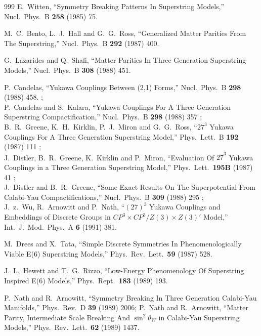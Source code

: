 \begin{thebibliography}{999}
  E.~Witten,
  ``Symmetry Breaking Patterns In Superstring Models,''
  Nucl.\ Phys.\ B {\bf 258} (1985) 75.

  M.~C.~Bento, L.~J.~Hall and G.~G.~Ross,
  ``Generalized Matter Parities From The Superstring,''
  Nucl.\ Phys.\ B {\bf 292} (1987) 400.

  G.~Lazarides and Q.~Shafi,
  ``Matter Parities In Three Generation Superstring Models,''
  Nucl.\ Phys.\ B {\bf 308} (1988) 451.

  P.~Candelas,
  ``Yukawa Couplings Between (2,1) Forms,''
  Nucl.\ Phys.\ B {\bf 298} (1988) 458.
;\\
  P.~Candelas and S.~Kalara,
  ``Yukawa Couplings For A Three Generation Superstring Compactification,''
  Nucl.\ Phys.\ B {\bf 298} (1988) 357
;\\
  B.~R.~Greene, K.~H.~Kirklin, P.~J.~Miron and G.~G.~Ross,
  ``$27^3$ Yukawa Couplings For A Three Generation Superstring Model,''
  Phys.\ Lett.\ B {\bf 192} (1987) 111
 ;\\
  J.~Distler, B.~R.~Greene, K.~Kirklin and P.~Miron,
  ``Evaluation Of $\overline{27}^3$ Yukawa Couplings in a Three Generation Superstring
  Model,''
  Phys.\ Lett.\  {\bf 195B} (1987) 41
 ; \\
  J.~Distler and B.~R.~Greene,
  ``Some Exact Results On The Superpotential From Calabi-Yau
  Compactifications,''
  Nucl.\ Phys.\ B {\bf 309} (1988) 295
;\\
  J.~z.~Wu, R.~Arnowitt and P.~Nath,
  ``$(27)^3$ Yukawa Couplings and Embeddings of Discrete Groups in $CP^3\times CP^3/Z(3)\times Z(3)'$ Model,''
  Int.\ J.\ Mod.\ Phys.\ A {\bf 6} (1991) 381.

  M.~Drees and X.~Tata,
  ``Simple Discrete Symmetries In Phenomenologically Viable E(6) Superstring
  Models,''
  Phys.\ Rev.\ Lett.\  {\bf 59} (1987) 528.

  J.~L.~Hewett and T.~G.~Rizzo,
  ``Low-Energy Phenomenology Of Superstring Inspired E(6) Models,''
  Phys.\ Rept.\  {\bf 183} (1989) 193.

  P.~Nath and R.~Arnowitt,
  ``Symmetry Breaking In Three Generation Calabi-Yau Manifolds,''
  Phys.\ Rev.\ D {\bf 39} (1989) 2006;
  P.~Nath and R.~Arnowitt,
  ``Matter Parity, Intermediate Scale Breaking And $\sin^2\theta_W$ in Calabi-Yau
  Superstring Models,''
  Phys.\ Rev.\ Lett.\  {\bf 62} (1989) 1437.


\end{thebibliography}
